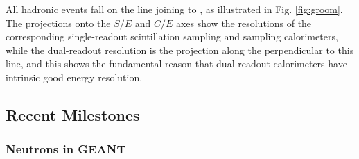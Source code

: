 All hadronic events fall on the line joining  to , as illustrated in Fig. \ref{fig:groom}.  The projections 
onto the $S/E$ and $C/E$   axes show the resolutions of the corresponding single-readout scintillation sampling and \C sampling calorimeters, while the dual-readout resolution is the projection along the perpendicular to this line, and
  this shows the fundamental reason that dual-readout calorimeters have intrinsic good energy resolution.






\subsection{Recent Milestones}

\subsubsection{Neutrons in GEANT}            \label{sec:geant}  


